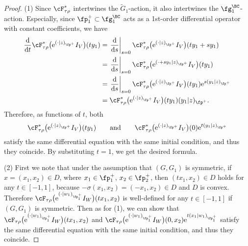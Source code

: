 \begin{proof}
(1) Since $\cF_{\tau\rho}^*$ intertwines the $\tilde{G}_1$-action, it also intertwines the $\fg^\BC_1$-action.
Especially, since $\fp^+_1\subset \fg^\BC_1$ acts as a 1st-order differential operator with constant coefficients, we have
\begin{align*}
\frac{{\rm d}}{{\rm d}t}\cF_{\tau\rho}^*\big({\rm e}^{(\cdot|z)_{\fp^+}}I_V\big)(ty_1)
&=\left.\frac{{\rm d}}{{\rm d}s}\right|_{s=0}\cF_{\tau\rho}^*\big({\rm e}^{(\cdot|z)_{\fp^+}}I_V\big)(ty_1+sy_1) \\
&=\left.\frac{{\rm d}}{{\rm d}s}\right|_{s=0}\cF_{\tau\rho}^*\big({\rm e}^{(\cdot+sy_1|z)_{\fp^+}}I_V\big)(ty_1)\\
& =\left.\frac{{\rm d}}{{\rm d}s}\right|_{s=0}\cF_{\tau\rho}^*\big({\rm e}^{(\cdot|z)_{\fp^+}}I_V\big)(ty_1){\rm e}^{s(y_1|z)_{\fp^+}} \\
&=\cF_{\tau\rho}^*\big({\rm e}^{(\cdot|z)_{\fp^+}}I_V\big)(ty_1)(y_1|z)_{\fp^+}.
\end{align*}
Therefore, as functions of $t$, both
\begin{gather*} \cF_{\tau\rho}^*\big({\rm e}^{(\cdot|z)_{\fp^+}}I_V\big)(ty_1)\qquad \text{and} \qquad
\cF_{\tau\rho}^*\big({\rm e}^{(\cdot|z)_{\fp^+}}I_V\big)(0){\rm e}^{t(y_1|z)_{\fp^+}} \end{gather*}
satisfy the same differential equation with the same initial condition, and thus they coincide.
By substituting $t=1$, we get the desired formula.

(2) First we note that under the assumption that $(G,G_1)$ is symmetric,
if $x=(x_1,x_2)\in D$, where $x_1\in\fp^+_1$, $x_2\in\fp^+_2$, then $(tx_1,x_2)\in D$ holds for any $t\in[-1,1]$,
because $-\sigma(x_1,x_2)=(-x_1,x_2)\in D$ and $D$ is convex.
Therefore $\cF_{\tau\rho}\big({\rm e}^{(\cdot|w_1)_{\fp^+_1}}I_W\big)(tx_1,x_2)$ is well-defined for any $t\in[-1,1]$ if $(G,G_1)$ is symmetric.
Then as for (1), we can show that $\cF_{\tau\rho}\big({\rm e}^{(\cdot|w_1)_{\fp^+_1}}I_W\big)(tx_1,x_2)$ and
$\cF_{\tau\rho}\big({\rm e}^{(\cdot|w_1)_{\fp^+_1}}I_W\big)(0,x_2){\rm e}^{t(x_1|w_1)_{\fp^+_1}}$ satisfy the same differential equation
with the same initial condition, and thus they coincide.
\end{proof}


